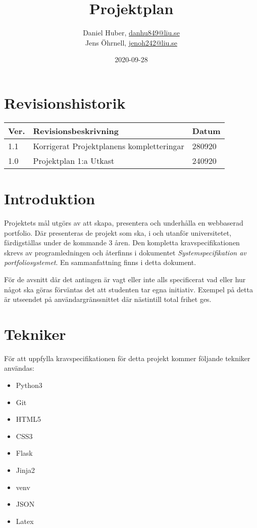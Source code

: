 \documentclass{TDP003mall}
\author{Daniel Huber, \url{danhu849@liu.se}\\
  Jens Öhrnell, \url{jenoh242@liu.se}}
\title{Projektplan}
\date{2020-09-28}
\begin{document}
\projectpage

\tableofcontents

\newpage
\section{Revisionshistorik}
\begin{table}[!h]
\begin{tabularx}{\linewidth}{|l|X|l|}
\hline
  Ver. & Revisionsbeskrivning & Datum \\\hline
  1.1 & Korrigerat Projektplanens kompletteringar & 280920 \\\hline
  1.0 & Projektplan 1:a Utkast & 240920 \\\hline
\end{tabularx}
\end{table}


\section{Introduktion}
Projektets mål utgörs av att skapa, presentera och underhålla en webbaserad portfolio. Där presenteras de projekt som ska, i och utanför universitetet, färdigställas under de kommande 3 åren. Den kompletta kravspecifikationen skrevs av programledningen och återfinns i dokumentet \textit{Systemspecifikation av portfoliosystemet}. En sammanfattning finns i detta dokument.

För de avsnitt där det antingen är vagt eller inte alls specificerat vad eller hur något ska göras förväntas det att studenten tar egna initiativ. Exempel på detta är utseendet på användargränssnittet där nästintill total frihet ges.

\section{Tekniker}
För att uppfylla kravspecifikationen för detta projekt kommer följande tekniker användas:
\begin{itemize}
\item Python3
\item Git
\item HTML5
\item CSS3
\item Flask
\item Jinja2
\item venv
\item JSON
\item Latex
\end{itemize}
\end{document}
